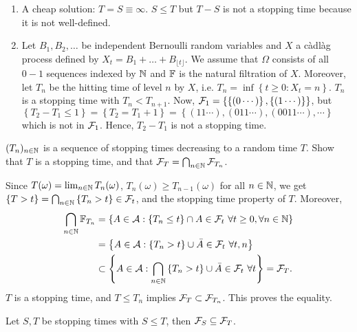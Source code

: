\solution
\begin{enumerate}
    \item A cheap solution: $T=S\equiv\infty$. $S\leq T$ but $T-S$ is not a stopping
        time because it is not well-defined.

    \item Let $B_1, B_2,\dots $ be independent Bernoulli random variables and
        $X$ a c\`adl\`ag process defined by $X_t = B_1 + \dots + B_{\lfloor t
        \rfloor}$.  We assume that $\Omega$ consists of all $0-1$ sequences
        indexed by $\mathbb N$ and $\mathbb F$ is the natural filtration of $X$. Moreover,
        let $T_n$ be the hitting time of level $n$ by $X$, i.e. $T_n = \inf
        \left\{ t\geq 0 : X_t = n  \right\}$. $T_n$ is a stopping time with
        $T_n < T_{n+1}$. Now, $\mathcal F_{1} = \left\{ \left\{ (0\cdots) \right\},
        \left\{ (1\cdots) \right\} \right\}$, but $\left\{ T_2 - T_1 \leq 1
        \right\} = \left\{ T_2 = T_1 + 1 \right\} = \left\{ (11\cdots),
            (011\cdots), (0011\cdots), \cdots \right\}$ which is not in $\mathcal F_1$. 
        Hence, $T_2 - T_1$ is not a stopping time. 
\end{enumerate}

$(T_n)_{n\in\mathbb N}$ is a sequence of stopping times decreasing to a random time
$T$. Show that $T$ is a stopping time, and that $\mathcal F_{T} = \bigcap_{n\in\mathbb N}
\mathcal F_{T_n}$. 

\solution 
Since $T(\omega) = \lim_{n\in\mathbb N} T_{n}(\omega)$, $T_{n}(\omega) \geq
T_{n-1}(\omega)$ for all $n\in\mathbb N$, we get $\left\{ T>t \right\} =
\bigcap_{n\in\mathbb N} \left\{ T_{n}>t \right\} \in \mathcal F_{t}$, and the stopping time
property of $T$. Moreover, 
\begin{align*}
    \bigcap_{n\in\mathbb N} \mathbb F_{T_{n}} &= \left\{ A\in\mathcal A : \left\{ T_n\leq t \right\}\cap A \in \mathcal F_{t} \ \forall t\geq 0,\forall n\in\mathbb N \right\} \\
    &= \left\{ A \in \mathcal A : \left\{ T_{n}>t \right\}\cup \bar A \in\mathcal F_{t} \ \forall t,n \right\} \\
    &\subset \left\{A\in\mathcal A :\bigcap_{n\in\mathbb N} \left\{T_{n}>t\right\} \cup \bar A\in\mathcal F_t \ \forall t \right\}
    = \mathcal F_{T}.
\end{align*}
$T$ is a stopping time, and $T\leq T_n$ implies $\mathcal F_{T} \subset \mathcal F_{T_{n}}$.
This proves the equality.

 Let $S, T$ be
stopping times with $S\leq T$, then $\mathcal F_{S} \subseteq \mathcal F_{T}$.

